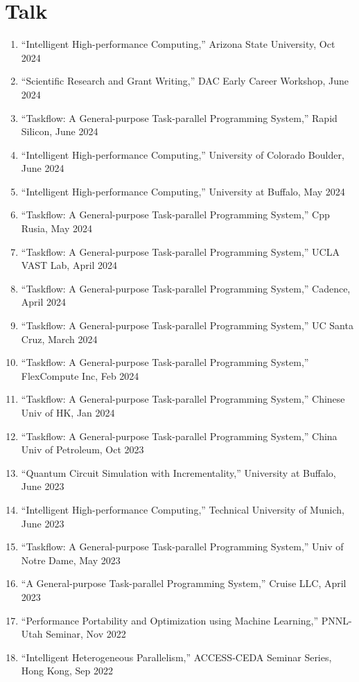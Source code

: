\documentclass[A4,11pt]{article}
\begin{document}
\section{Talk}
 \begin{enumerate}
 \itemsep-0.3em
  \item ``Intelligent High-performance Computing,'' Arizona State University, Oct 2024
  \item ``Scientific Research and Grant Writing,'' DAC Early Career Workshop, June 2024
  \item ``Taskflow: A General-purpose Task-parallel Programming System,'' Rapid Silicon, June 2024
  \item ``Intelligent High-performance Computing,'' University of Colorado Boulder, June 2024
  \item ``Intelligent High-performance Computing,'' University at Buffalo, May 2024
  \item ``Taskflow: A General-purpose Task-parallel Programming System,'' Cpp Rusia, May 2024
  \item ``Taskflow: A General-purpose Task-parallel Programming System,'' UCLA VAST Lab, April 2024
  \item ``Taskflow: A General-purpose Task-parallel Programming System,'' Cadence, April 2024
  \item ``Taskflow: A General-purpose Task-parallel Programming System,'' UC Santa Cruz, March 2024 
  \item ``Taskflow: A General-purpose Task-parallel Programming System,'' FlexCompute Inc, Feb 2024
  \item ``Taskflow: A General-purpose Task-parallel Programming System,'' Chinese Univ of HK, Jan 2024
  \item ``Taskflow: A General-purpose Task-parallel Programming System,'' China Univ of Petroleum, Oct 2023
  \item ``Quantum Circuit Simulation with Incrementality,'' University at Buffalo, June 2023
  \item ``Intelligent High-performance Computing,'' Technical University of Munich, June 2023
  \item ``Taskflow: A General-purpose Task-parallel Programming System,'' Univ of Notre Dame, May 2023
  \item ``A General-purpose Task-parallel Programming System,'' Cruise LLC, April 2023
  \item ``Performance Portability and Optimization using Machine Learning,'' PNNL-Utah Seminar, Nov 2022
  \item ``Intelligent Heterogeneous Parallelism,'' ACCESS-CEDA Seminar Series, Hong Kong, Sep 2022

\end{enumerate}
\end{document}
